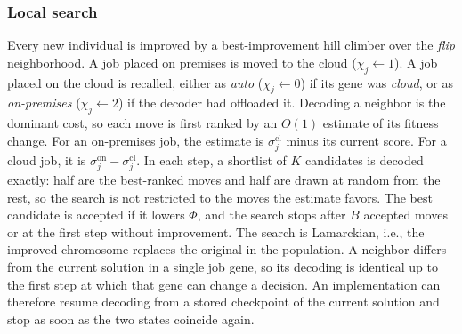 \documentclass[conference]{IEEEtran}
\begin{document}
\subsubsection{Local search}
Every new individual is improved by a best-improvement hill climber over the \emph{flip} neighborhood. A job placed on premises is moved to the cloud ($\chi_j\gets1$). A job placed on the cloud is recalled, either as \emph{auto} ($\chi_j\gets0$) if its gene was \emph{cloud}, or as \emph{on-premises} ($\chi_j\gets2$) if the decoder had offloaded it. Decoding a neighbor is the dominant cost, so each move is first ranked by an $O(1)$ estimate of its fitness change. For an on-premises job, the estimate is $\sigma_j^{\mathrm{cl}}$ minus its current score. For a cloud job, it is $\sigma_j^{\mathrm{on}}-\sigma_j^{\mathrm{cl}}$. In each step, a shortlist of $K$ candidates is decoded exactly: half are the best-ranked moves and half are drawn at random from the rest, so the search is not restricted to the moves the estimate favors. The best candidate is accepted if it lowers $\Phi$, and the search stops after $B$ accepted moves or at the first step without improvement. The search is Lamarckian, i.e., the improved chromosome replaces the original in the population. A neighbor differs from the current solution in a single job gene, so its decoding is identical up to the first step at which that gene can change a decision. An implementation can therefore resume decoding from a stored checkpoint of the current solution and stop as soon as the two states coincide again.
\end{document}
